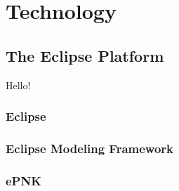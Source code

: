 \chapter{Technology}
\label{chap:technology}


\section{The Eclipse Platform}
Hello!
\subsection{Eclipse}
\subsection{Eclipse Modeling Framework}
\subsection{ePNK}
